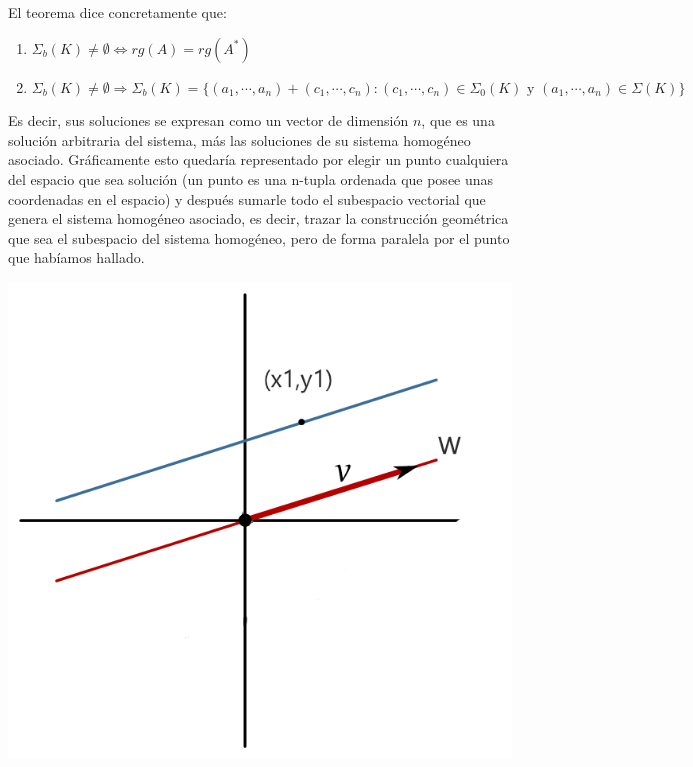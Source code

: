 \documentclass[10pt,a4paper,openright]{book}
\theoremstyle{break}
\begin{document}
El teorema dice concretamente que:
\begin{enumerate}
\item $\Sigma_b(K)\neq \emptyset\Leftrightarrow rg(A)=rg(A^*) $
\item $\Sigma_b(K)\neq \emptyset\Rightarrow \Sigma_b(K)=\{(a_1, \cdots, a_n)+(c_1, \cdots, c_n): (c_1,\cdots ,c_n)\in \Sigma_0(K) \mbox{ y }(a_1,\cdots,a_n)\in \Sigma(K)\}$
\end{enumerate}
Es decir, sus soluciones se expresan como un vector de dimensión $n$, que es una solución arbitraria del sistema, más las soluciones de su sistema homogéneo asociado.
Gráficamente esto quedaría representado por elegir un punto cualquiera del espacio que sea solución (un punto es una n-tupla ordenada que posee unas coordenadas en el espacio) y después sumarle todo el subespacio vectorial que genera el sistema homogéneo asociado, es decir, trazar la construcción geométrica que sea el subespacio del sistema homogéneo, pero de forma paralela por el punto que habíamos hallado.

\begin{center}
\includegraphics[scale=0.45]{Sistema asociado}
\end{center}
\end{document}
